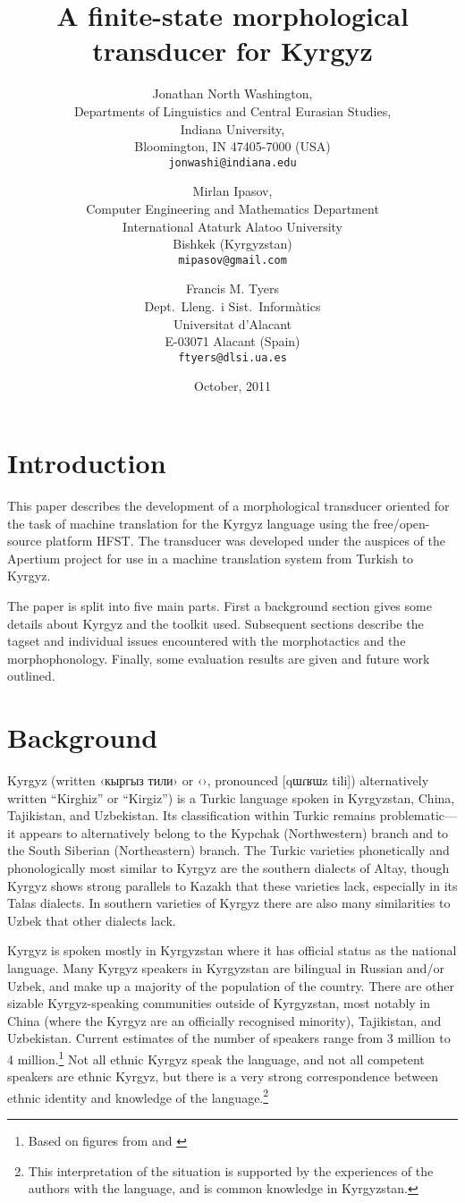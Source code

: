 \documentclass[a4paper,12pt,onecolumn,oneside]{article}
\title{A finite-state morphological transducer for Kyrgyz}
\author {Jonathan North Washington, \\
Departments of Linguistics and Central Eurasian Studies,\\
Indiana University,\\
Bloomington, IN 47405-7000 (USA)\\
\texttt{jonwashi@indiana.edu} \and 
Mirlan Ipasov,\\
Computer Engineering and Mathematics Department\\
International Ataturk Alatoo University\\
Bishkek (Kyrgyzstan)\\
\texttt{mipasov@gmail.com} \and
Francis M. Tyers\\
Dept.\ Lleng.\ i Sist.\ Informàtics \\  
Universitat d'Alacant\\
E-03071 Alacant (Spain)\\
\texttt{ftyers@dlsi.ua.es} 
 }
\date{October, 2011}
\begin{document}
\maketitle{}
\thispagestyle{empty}

\section{Introduction}
This paper describes the development of a morphological transducer oriented for the task of machine translation for the Kyrgyz language using the free/open-source platform HFST. The transducer was developed under the auspices of the Apertium \citet{forcada2011} project for use in a machine translation system from Turkish to Kyrgyz.

The paper is split into five main parts. First a background section gives some details about Kyrgyz and the toolkit used. Subsequent sections describe the tagset and individual issues encountered with the morphotactics and the morphophonology. Finally, some evaluation results are given and future work outlined.

\section{Background}
Kyrgyz (written ‹кыргыз тили› or ‹›, pronounced [qɯɾʁɯz tili]) alternatively written ``Kirghiz'' or ``Kirgiz'') is a Turkic language spoken in Kyrgyzstan, China, Tajikistan, and Uzbekistan.  Its classification within Turkic remains problematic—it appears to alternatively belong to the Kypchak (Northwestern) branch and to the South Siberian (Northeastern) branch.  The Turkic varieties phonetically and phonologically most similar to Kyrgyz are the southern dialects of Altay, though Kyrgyz shows strong parallels to Kazakh that these varieties lack, especially in its Talas dialects.  In southern varieties of Kyrgyz there are also many similarities to Uzbek that other dialects lack.

Kyrgyz is spoken mostly in Kyrgyzstan where it has official status as the national language.  Many Kyrgyz speakers in Kyrgyzstan are bilingual in Russian and/or Uzbek, and make up a majority of the population of the country.  There are other sizable Kyrgyz-speaking communities outside of Kyrgyzstan, most notably in China (where the Kyrgyz are an officially recognised minority), Tajikistan, and Uzbekistan.  Current estimates of the number of speakers range from 3 million to 4 million.\footnote{Based on figures from \citet{lewis2009} and \citet{factbook2009}}  Not all ethnic Kyrgyz speak the language, and not all competent speakers are ethnic Kyrgyz, but there is a very strong correspondence between ethnic identity and knowledge of the language.\footnote{This interpretation of the situation is supported by the experiences of the authors with the language, and is common knowledge in Kyrgyzstan.}
\end{document}
